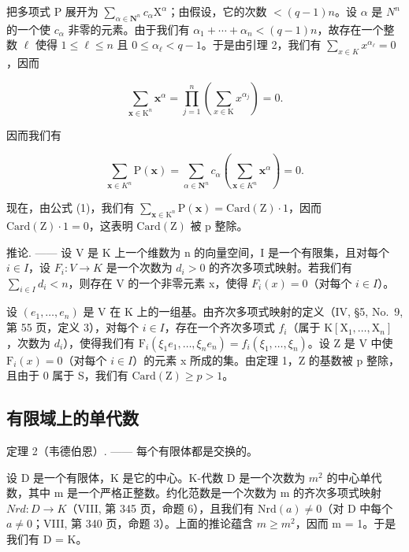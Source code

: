 把多项式 P 展开为 \(\sum_{\alpha\in\mathbf{N}^{n}}c_{\alpha}\mathrm{X}^{\alpha}\)；由假设，它的次数 \(< (q-1)n\)。设 \(\alpha\) 是 \(N^{n}\) 的一个使 \(c_{\alpha}\) 非零的元素。由于我们有 \(\alpha_{1}+\cdots+\alpha_{n}<(q-1)n\)，故存在一个整数 \(\ell\) 使得 \(1\leqslant\ell\leqslant n\) 且 \(0\leqslant\alpha_{\ell}<q-1\)。于是由引理 2，我们有 \(\sum_{x\in K}x^{\alpha_{\ell}}=0\)，因而

\[
\sum_ {\mathbf {x} \in \mathrm{K} ^ {n}} \mathbf {x} ^ {\alpha} = \prod_ {j = 1} ^ {n} \left(\sum_ {x \in \mathrm{K}} x ^ {\alpha_ {j}}\right) = 0.
\]

因而我们有

\[
\sum_ {\mathbf {x} \in K ^ {n}} \mathrm{P} (\mathbf {x}) = \sum_ {\alpha \in \mathbf {N} ^ {n}} c _ {\alpha} \left(\sum_ {\mathbf {x} \in K ^ {n}} \mathbf {x} ^ {\alpha}\right) = 0.
\]

现在，由公式 (1)，我们有 \(\sum_{\mathbf{x}\in\mathrm{K}^{n}}\mathrm{P}(\mathbf{x})=\mathrm{Card}(\mathrm{Z})\cdot1\)，因而 \(\mathrm{Card}(\mathrm{Z})\cdot1=0\)，这表明 \(\mathrm{Card}(\mathrm{Z})\) 被 p 整除。

推论. —— 设 V 是 K 上一个维数为 n 的向量空间，I 是一个有限集，且对每个 \(i \in I\)，设 \(F_{i}: V \to K\) 是一个次数为 \(d_{i} > 0\) 的齐次多项式映射。若我们有 \(\sum_{i \in I} d_{i} < n\)，则存在 V 的一个非零元素 x，使得 \(F_{i}(x) = 0\)（对每个 \(i \in I\)）。

设 \((e_{1},\ldots,e_{n})\) 是 V 在 K 上的一组基。由齐次多项式映射的定义（IV, §5, No.~9, 第 55 页，定义 3），对每个 \(i\in I\)，存在一个齐次多项式 \(f_{i}\)（属于 \(\mathrm{K}[\mathrm{X}_{1},\ldots,\mathrm{X}_{n}]\)，次数为 \(d_{i}\)），使得我们有 \(\mathrm{F}_{i}(\xi_{1}e_{1},\ldots,\xi_{n}e_{n})=f_{i}(\xi_{1},\ldots,\xi_{n})\)。设 Z 是 V 中使 \(\mathrm{F}_{i}(x)=0\)（对每个 \(i\in I\)）的元素 x 所成的集。由定理 1，Z 的基数被 p 整除，且由于 0 属于 S，我们有 \(\mathrm{Card}(\mathrm{Z})\geqslant p>1\)。

\subsection{有限域上的单代数}

定理 2（韦德伯恩）. —— 每个有限体都是交换的。

设 D 是一个有限体，K 是它的中心。K-代数 D 是一个次数为 \(m^{2}\) 的中心单代数，其中 m 是一个严格正整数。约化范数是一个次数为 m 的齐次多项式映射 \(Nrd : D \to K\)（VIII, 第 345 页，命题 6），且我们有 \(\text{Nrd}(a) \neq 0\)（对 D 中每个 \(a \neq 0\)；VIII, 第 340 页，命题 3）。上面的推论蕴含 \(m \geqslant m^{2}\)，因而 m = 1。于是我们有 D = K。

